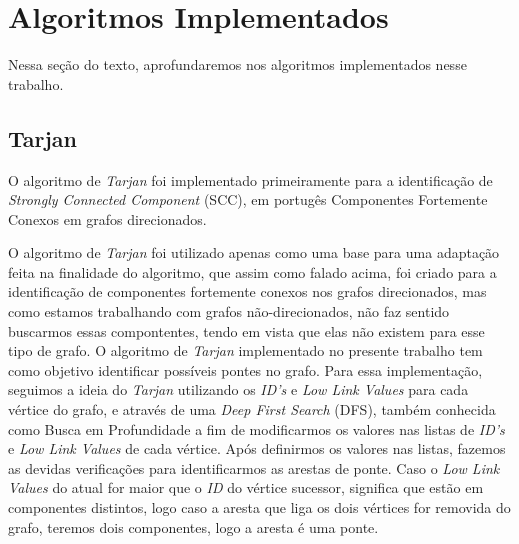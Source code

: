 
\newpage
\section{Algoritmos Implementados}
Nessa seção do texto, aprofundaremos nos algoritmos implementados nesse trabalho.
\subsection{Tarjan}
O algoritmo de \textit{Tarjan} foi implementado primeiramente para a identificação de \textit{Strongly Connected Component} (SCC), em portugês Componentes Fortemente Conexos em grafos direcionados.

O algoritmo de \textit{Tarjan} foi utilizado apenas como uma base para uma adaptação feita na finalidade do algoritmo, que assim como falado acima, foi criado para a identificação de componentes fortemente conexos nos grafos direcionados, mas como estamos trabalhando com grafos não-direcionados, não faz sentido buscarmos essas compontentes, tendo em vista que elas não existem para esse tipo de grafo. O algoritmo de \textit{Tarjan} implementado no presente trabalho tem como objetivo identificar possíveis pontes no grafo. Para essa implementação, seguimos a ideia do \textit{Tarjan} utilizando os \textit{ID's} e \textit{Low Link Values} para cada vértice do grafo, e através de uma \textit{Deep First Search} (DFS), também conhecida como Busca em Profundidade a fim de modificarmos os valores nas listas de \textit{ID's} e \textit{Low Link Values} de cada vértice. Após definirmos os valores nas listas, fazemos as devidas verificações para identificarmos as arestas de ponte. Caso o \textit{Low Link Values} do atual for maior que o \textit{ID} do vértice sucessor, significa que estão em componentes distintos, logo caso a aresta que liga os dois vértices for removida do grafo, teremos dois componentes, logo a aresta é uma ponte.

